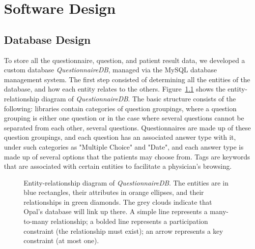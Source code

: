 \documentclass{higrep}
\newcommand{\figureref}[1]{Figure~\ref{#1}}
\begin{document}
\chapter{Software Design}\label{Sec:SoftwareDesign}

\section{Database Design}

To store all the questionnaire, question, and patient result data, we developed a custom database \textit{QuestionnaireDB}, managed via the MySQL database management system. The first step consisted of determining all the entities of the database, and how each entity relates to the others. \figureref{Fig:ER_Diagram} shows the entity-relationship diagram of \textit{QuestionnaireDB}. The basic structure consists of the following: libraries contain categories of question groupings, where a question grouping is either one question or in the case where several questions cannot be separated from each other, several questions. Questionnaires are made up of these question groupings, and each question has an associated answer type with it, under such categories as "Multiple Choice" and "Date", and each answer type is made up of several options that the patients may choose from. Tags are keywords that are associated with certain entities to facilitate a physician's browsing.

\begin{figure}[htbp]
  \centering
  \caption{Entity-relationship diagram of \textit{QuestionnaireDB}. The entities are in blue rectangles, their attributes in orange ellipses, and their relationships in green diamonds. The grey clouds indicate that Opal's database will link up there. A simple line represents a many-to-many relationship; a bolded line represents a participation constraint (the relationship must exist); an arrow represents a key constraint (at most one).} \label{Fig:ER_Diagram}
\end{figure}
\end{document}
